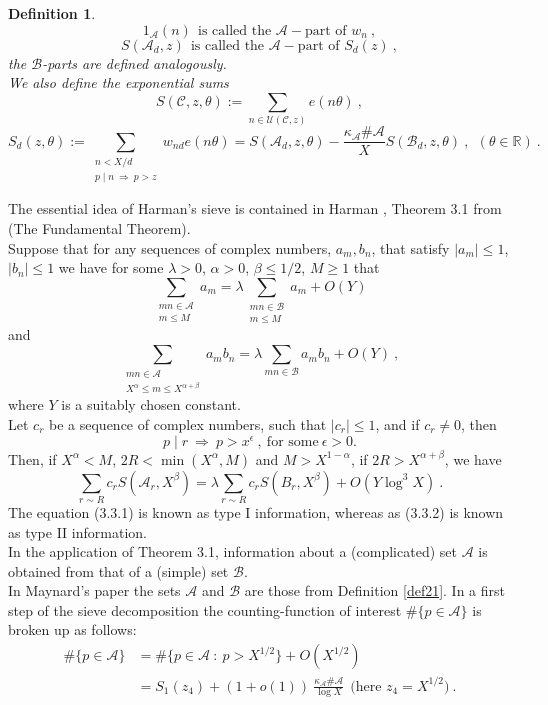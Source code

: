 \documentclass{amsart}
\numberwithin{equation}{subsection}
\newtheorem{definition}[theorem]{Definition}
\begin{document}
\begin{definition}
$$1_{\mathcal{A}}(n)\ \ \text{is called the $\mathcal{A}-$part of } w_n\:,$$
$$S(\mathcal{A}_d, z)\ \ \text{is called the $\mathcal{A}-$part of } S_d(z)\:,$$
the $\mathcal{B}$-parts are defined analogously.\\
We also define the exponential sums 
$$S(\mathcal{C}, z, \theta):=\sum_{n\in\mathcal{U}(\mathcal{C},z)}e(n\theta)\:,$$
$$S_d(z, \theta):=\sum_{\substack{n<X/d\\ p\mid n\ \Rightarrow\ p>z}}w_{nd}e(n\theta)=S(\mathcal{A}_d,z,\theta)-\frac{\kappa_{\mathcal{A}}\#\mathcal{A}}{X}S(\mathcal{B}_d, z, \theta)\:,\ \ (\theta\in\mathbb{R})\:.$$
\end{definition}

The essential idea of Harman's sieve is contained in Harman \cite{harman}, Theorem 3.1 from \cite{harman} (The Fundamental Theorem).\\
Suppose that for any sequences of complex numbers, $a_m, b_n$, that satisfy $|a_m|\leq 1$, $|b_n|\leq 1$ we have for some $\lambda>0$, $\alpha>0$, $\beta\leq 1/2$, $M\geq 1$ that 
\[
\sum_{\substack{mn\in\mathcal{A}\\ m\leq M}} a_m=\lambda \sum_{\substack{mn\in\mathcal{B}\\ m\leq M}}a_m+O(Y) \tag{3.3.1}
\]
and
\[
\sum_{\substack{mn\in\mathcal{A}\\ X^{\alpha}\leq m\leq X^{\alpha+\beta}}} a_mb_n=\lambda \sum_{mn\in\mathcal{B}}a_mb_n+O(Y)\:, \tag{3.3.2}
\]
where $Y$ is a suitably chosen constant.\\
Let $c_r$ be a sequence of complex numbers, such that $|c_r|\leq 1$, and if $c_r\neq 0$, then 
\[
p\mid r\ \Rightarrow\ p>x^{\epsilon}\:,\ \text{for some}\ \epsilon>0.  \tag{3.3.3}
\]
Then, if $X^{\alpha}<M$, $2R<\min(X^\alpha, M)$ and $M>X^{1-\alpha}$, if $2R>X^{\alpha+\beta}$, we have
\[
\sum_{r\sim R}c_rS(\mathcal{A}_r, X^\beta)=\lambda\sum_{r\sim R} c_r S(B_r, X^\beta)+O(Y\log^3X)\:. \tag{3.3.4}
\]
The equation (3.3.1) is known as type I information, whereas as (3.3.2) is known as type II information.\\
In the application of Theorem 3.1, information about a (complicated) set $\mathcal{A}$ is obtained from that of a (simple) set $\mathcal{B}$.\\
In Maynard's paper \cite{maynard} the sets $\mathcal{A}$ and $\mathcal{B}$ are those from Definition \ref{def21}. In a first step of the sieve decomposition the counting-function of interest $\#\{p\in \mathcal{A}\}$ is broken up as follows:
\begin{align*}
\#\{p\in \mathcal{A}\}&=\#\{p\in\mathcal{A}\::\: p>X^{1/2}\}+O(X^{1/2})\\
&=S_1(z_4)+(1+o(1))\:\frac{\kappa_{\mathcal{A}}\#\mathcal{A}}{\log X}\ \ \text{(here $z_4=X^{1/2}$)}\:.
\end{align*}
\end{document}
